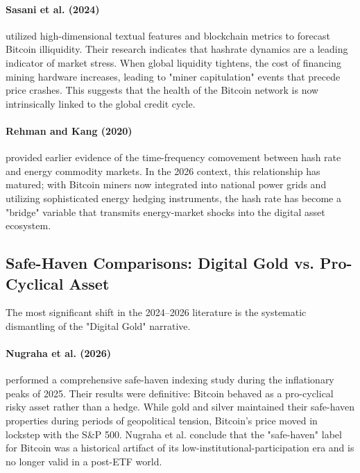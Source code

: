 \documentclass[10pt, conference, compsocconf]{IEEEtran}
\begin{document}
\paragraph{Sasani et al. (2024)} utilized high-dimensional textual features and blockchain metrics to forecast Bitcoin illiquidity. Their research indicates that hashrate dynamics are a leading indicator of market stress. When global liquidity tightens, the cost of financing mining hardware increases, leading to "miner capitulation" events that precede price crashes. This suggests that the health of the Bitcoin network is now intrinsically linked to the global credit cycle.

\paragraph{Rehman and Kang (2020)} provided earlier evidence of the time-frequency comovement between hash rate and energy commodity markets. In the 2026 context, this relationship has matured; with Bitcoin miners now integrated into national power grids and utilizing sophisticated energy hedging instruments, the hash rate has become a "bridge" variable that transmits energy-market shocks into the digital asset ecosystem.


\subsection{Safe-Haven Comparisons: Digital Gold vs. Pro-Cyclical Asset}

The most significant shift in the 2024--2026 literature is the systematic dismantling of the "Digital Gold" narrative.

\paragraph{Nugraha et al. (2026)} performed a comprehensive safe-haven indexing study during the inflationary peaks of 2025. Their results were definitive: Bitcoin behaved as a pro-cyclical risky asset rather than a hedge. While gold and silver maintained their safe-haven properties during periods of geopolitical tension, Bitcoin’s price moved in lockstep with the S\&P 500. Nugraha et al. conclude that the "safe-haven" label for Bitcoin was a historical artifact of its low-institutional-participation era and is no longer valid in a post-ETF world.
\end{document}
